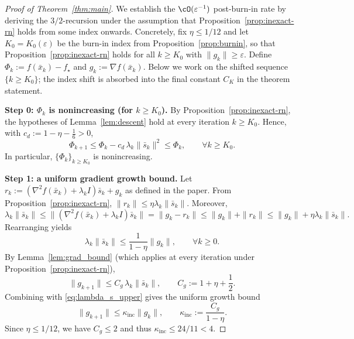 \documentclass[review,onefignum,onetabnum]{siamart171218}
\begin{document}
\begin{proof}[Proof of Theorem~\ref{thm:main}]
We establish the $\cO(\varepsilon^{-1})$ post-burn-in rate
by deriving the $3/2$-recursion under the assumption that
Proposition~\ref{prop:inexact-rn} holds from some index onwards.
Concretely, fix $\eta\le 1/12$ and let $K_0=K_0(\varepsilon)$ be
the burn-in index from Proposition~\ref{prop:burnin}, so that
Proposition~\ref{prop:inexact-rn} holds for all $k\ge K_0$ with
$\|g_k\|\ge\varepsilon$.
Define $\Phi_k:=f(\bar x_k)-f_\star$ and $g_k:=\nabla f(\bar x_k)$.
Below we work on the shifted sequence $\{k\ge K_0\}$; the
index shift is absorbed into the final constant $C_K$ in the
theorem statement.

\smallskip
\noindent\textbf{Step 0: $\Phi_k$ is nonincreasing (for $k\ge K_0$).}
By Proposition~\ref{prop:inexact-rn}, the hypotheses of Lemma~\ref{lem:descent} hold at every iteration $k\ge K_0$.
Hence, with $c_d:=1-\eta-\frac16>0$,
\begin{equation}\label{eq:Phi_monotone}
\Phi_{k+1}\le \Phi_k - c_d\,\lambda_k\|\bar s_k\|^2\le \Phi_k,
\qquad \forall k\ge K_0.
\end{equation}
In particular, $\{\Phi_k\}_{k\ge K_0}$ is nonincreasing.

\smallskip
\noindent\textbf{Step 1: a uniform gradient growth bound.}
Let $r_k:=(\nabla^2 f(\bar x_k)+\lambda_k I)\bar s_k+g_k$ as defined in the paper.
From Proposition~\ref{prop:inexact-rn}, $\|r_k\|\le \eta\lambda_k\|\bar s_k\|$.
Moreover,
\[
\lambda_k\|\bar s_k\|
\le \|(\nabla^2 f(\bar x_k)+\lambda_k I)\bar s_k\|
=\|g_k-r_k\|
\le \|g_k\|+\|r_k\|
\le \|g_k\|+\eta\lambda_k\|\bar s_k\|.
\]
Rearranging yields
\begin{equation}\label{eq:lambda_s_upper}
\lambda_k\|\bar s_k\|\le \frac{1}{1-\eta}\|g_k\|,\qquad \forall k\ge 0.
\end{equation}
By Lemma~\ref{lem:grad_bound} (which applies at every iteration under Proposition~\ref{prop:inexact-rn}),
\[
\|g_{k+1}\|\le C_g\,\lambda_k\|\bar s_k\|,
\qquad
C_g:=1+\eta+\frac12.
\]
Combining with \eqref{eq:lambda_s_upper} gives the uniform growth bound
\begin{equation}\label{eq:grad_growth}
\|g_{k+1}\|\le \kappa_{\mathrm{inc}}\|g_k\|,
\qquad
\kappa_{\mathrm{inc}}:=\frac{C_g}{1-\eta}.
\end{equation}
Since $\eta\le 1/12$, we have $C_g\le 2$ and thus $\kappa_{\mathrm{inc}}\le 24/11<4$.


\end{proof}
\end{document}
